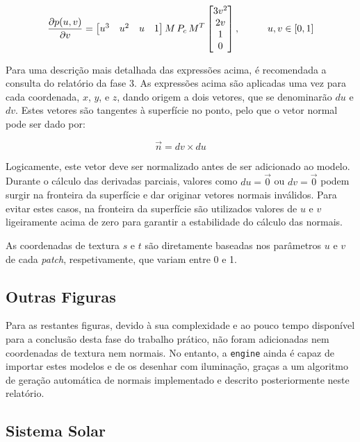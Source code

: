 \documentclass[12pt, a4paper]{article}
\begin{document}
$$
\def\arraystretch{1}
\frac{\partial p(u, v)}{\partial v} =
\begin{bmatrix}
    u^3 & u^2 & u & 1
\end{bmatrix}
M \, P_c \, M^T
\begin{bmatrix}
    3 v^2 \\ 2 v \\ 1 \\ 0
\end{bmatrix},
\hspace{1cm}
u, v \in \left [ 0, 1 \right ]
$$

Para uma descrição mais detalhada das expressões acima, é recomendada a consulta do relatório da
fase 3. As expressões acima são aplicadas uma vez para cada coordenada, $x$, $y$, e $z$, dando
origem a dois vetores, que se denominarão $du$ e $dv$. Estes vetores são tangentes à superfície no
ponto, pelo que o vetor normal pode ser dado por:

$$
\vec{n} = dv \times du
$$

Logicamente, este vetor deve ser normalizado antes de ser adicionado ao modelo. Durante o cálculo
das derivadas parciais, valores como $du = \vec{0}$ ou $dv = \vec{0}$ podem surgir na fronteira da
superfície e dar originar vetores normais inválidos. Para evitar estes casos, na fronteira da
superfície são utilizados valores de $u$ e $v$ ligeiramente acima de zero para garantir a
estabilidade do cálculo das normais.

As coordenadas de textura $s$ e $t$ são diretamente baseadas nos parâmetros $u$ e $v$ de cada
\emph{patch}, respetivamente, que variam entre 0 e 1.

\subsection{Outras Figuras}

Para as restantes figuras, devido à sua complexidade e ao pouco tempo disponível para a conclusão
desta fase do trabalho prático, não foram adicionadas nem coordenadas de textura nem normais. No
entanto, a \texttt{engine} ainda é capaz de importar estes modelos e de os desenhar com iluminação,
graças a um algoritmo de geração automática de normais implementado e descrito posteriormente neste
relatório.

\subsection{Sistema Solar}
\end{document}
